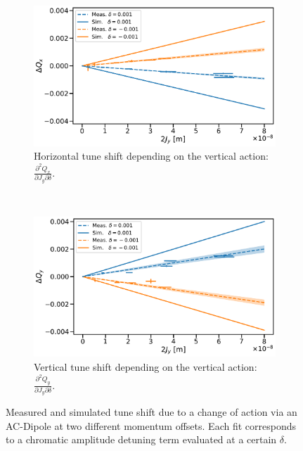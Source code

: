 \begin{figure}[H]
  \centering
  \begin{subfigure}{0.8\textwidth}
      \centering
      \includegraphics[width=\textwidth]{images/chromatic_amplitude_detuning/B2_Qxy_decay0.00.pdf}
      \caption{Horizontal tune shift depending on the vertical action: 
      $\frac{\partial^2 Q_x}{\partial J_y \partial \delta}$.}
      \label{figure:decapoles:chromatic_amplitude_detuning:b2qxy}
  \end{subfigure}
  \\[1em]
  \begin{subfigure}{0.8\textwidth}
      \centering
      \includegraphics[width=\textwidth]{images/chromatic_amplitude_detuning/B2_Qyy_decay0.00.pdf}
      \caption{Vertical tune shift depending on the vertical action: 
      $\frac{\partial^2 Q_y}{\partial J_y \partial \delta}$.}
      \label{figure:decapoles:chromatic_amplitude_detuning:b2qyy}
  \end{subfigure}
  \caption{Measured and simulated tune shift due to a change of action via an AC-Dipole at two
  different momentum offsets. Each fit corresponds to a chromatic amplitude detuning term evaluated
  at a certain $\delta$.}
  \label{figure:decapoles:chromatic_amplitude_detuning:two_terms}
\end{figure}

